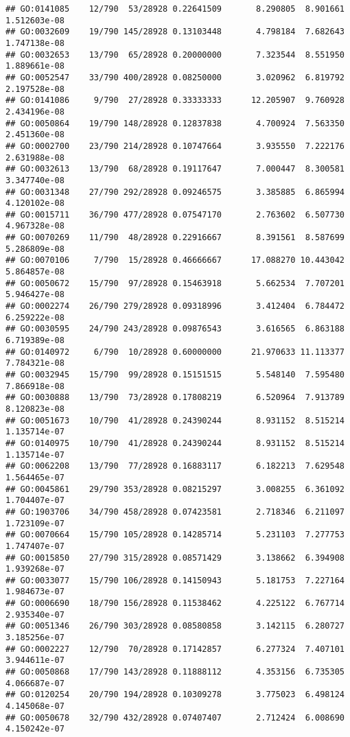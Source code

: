 \documentclass[
]{article}
\begin{document}
\begin{verbatim}
## GO:0141085    12/790  53/28928 0.22641509       8.290805  8.901661 1.512603e-08
## GO:0032609    19/790 145/28928 0.13103448       4.798184  7.682643 1.747138e-08
## GO:0032653    13/790  65/28928 0.20000000       7.323544  8.551950 1.889661e-08
## GO:0052547    33/790 400/28928 0.08250000       3.020962  6.819792 2.197528e-08
## GO:0141086     9/790  27/28928 0.33333333      12.205907  9.760928 2.434196e-08
## GO:0050864    19/790 148/28928 0.12837838       4.700924  7.563350 2.451360e-08
## GO:0002700    23/790 214/28928 0.10747664       3.935550  7.222176 2.631988e-08
## GO:0032613    13/790  68/28928 0.19117647       7.000447  8.300581 3.347740e-08
## GO:0031348    27/790 292/28928 0.09246575       3.385885  6.865994 4.120102e-08
## GO:0015711    36/790 477/28928 0.07547170       2.763602  6.507730 4.967328e-08
## GO:0070269    11/790  48/28928 0.22916667       8.391561  8.587699 5.286809e-08
## GO:0070106     7/790  15/28928 0.46666667      17.088270 10.443042 5.864857e-08
## GO:0050672    15/790  97/28928 0.15463918       5.662534  7.707201 5.946427e-08
## GO:0002274    26/790 279/28928 0.09318996       3.412404  6.784472 6.259222e-08
## GO:0030595    24/790 243/28928 0.09876543       3.616565  6.863188 6.719389e-08
## GO:0140972     6/790  10/28928 0.60000000      21.970633 11.113377 7.784321e-08
## GO:0032945    15/790  99/28928 0.15151515       5.548140  7.595480 7.866918e-08
## GO:0030888    13/790  73/28928 0.17808219       6.520964  7.913789 8.120823e-08
## GO:0051673    10/790  41/28928 0.24390244       8.931152  8.515214 1.135714e-07
## GO:0140975    10/790  41/28928 0.24390244       8.931152  8.515214 1.135714e-07
## GO:0062208    13/790  77/28928 0.16883117       6.182213  7.629548 1.564465e-07
## GO:0045861    29/790 353/28928 0.08215297       3.008255  6.361092 1.704407e-07
## GO:1903706    34/790 458/28928 0.07423581       2.718346  6.211097 1.723109e-07
## GO:0070664    15/790 105/28928 0.14285714       5.231103  7.277753 1.747407e-07
## GO:0015850    27/790 315/28928 0.08571429       3.138662  6.394908 1.939268e-07
## GO:0033077    15/790 106/28928 0.14150943       5.181753  7.227164 1.984673e-07
## GO:0006690    18/790 156/28928 0.11538462       4.225122  6.767714 2.935340e-07
## GO:0051346    26/790 303/28928 0.08580858       3.142115  6.280727 3.185256e-07
## GO:0002227    12/790  70/28928 0.17142857       6.277324  7.407101 3.944611e-07
## GO:0050868    17/790 143/28928 0.11888112       4.353156  6.735305 4.066687e-07
## GO:0120254    20/790 194/28928 0.10309278       3.775023  6.498124 4.145068e-07
## GO:0050678    32/790 432/28928 0.07407407       2.712424  6.008690 4.150242e-07

\end{verbatim}
\end{document}
